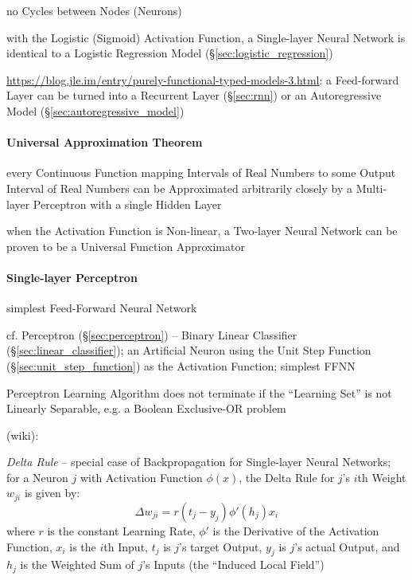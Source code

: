 no Cycles between Nodes (Neurons)

with the Logistic (Sigmoid) Activation Function, a Single-layer Neural Network
is identical to a Logistic Regression Model (\S\ref{sec:logistic_regression})

\url{https://blog.jle.im/entry/purely-functional-typed-models-3.html}: a
Feed-forward Layer can be turned into a Recurrent Layer (\S\ref{sec:rnn}) or an
Autoregressive Model (\S\ref{sec:autoregressive_model})



\paragraph{Universal Approximation Theorem}
\label{sec:universal_approximation}\hfill

every Continuous Function mapping Intervals of Real Numbers to some Output
Interval of Real Numbers can be Approximated arbitrarily closely by a
Multi-layer Perceptron with a single Hidden Layer

when the Activation Function is Non-linear, a Two-layer Neural Network can be
proven to be a Universal Function Approximator



\paragraph{Single-layer Perceptron}\label{sec:single_layer_perceptron}\hfill

simplest Feed-Forward Neural Network

cf. Perceptron (\S\ref{sec:perceptron}) -- Binary Linear Classifier
(\S\ref{sec:linear_classifier}); an Artificial Neuron using the Unit Step
Function (\S\ref{sec:unit_step_function}) as the Activation Function; simplest
FFNN

Perceptron Learning Algorithm does not terminate if the ``Learning Set'' is not
Linearly Separable, e.g. a Boolean Exclusive-OR problem

(wiki):

\emph{Delta Rule} -- special case of Backpropagation for Single-layer Neural
Networks; for a Neuron $j$ with Activation Function $\phi(x)$, the Delta Rule
for $j$'s $i$th Weight $w_{ji}$ is given by:
\[
  \Delta w_{ji} = r(t_j - y_j) \phi'(h_j) x_i
\]
where $r$ is the constant Learning Rate, $\phi'$ is the Derivative of the
Activation Function, $x_i$ is the $i$th Input, $t_j$ is $j$'s target Output,
$y_j$ is $j$'s actual Output, and $h_j$ is the Weighted Sum of $j$'s Inputs (the
``Induced Local Field'')



